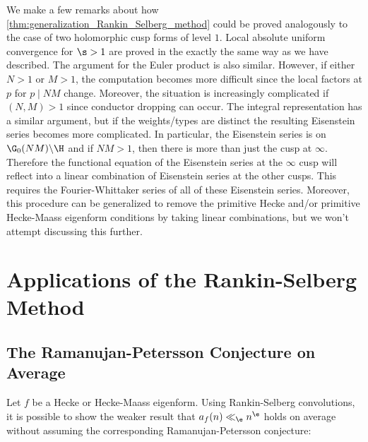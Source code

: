       We make a few remarks about how \cref{thm:generalization_Rankin_Selberg_method} could be proved analogously to the case of two holomorphic cusp forms of level $1$. Local absolute uniform convergence for $\s > 1$ are proved in the exactly the same way as we have described. The argument for the Euler product is also similar. However, if either $N > 1$ or $M > 1$, the computation becomes more difficult since the local factors at $p$ for $p \mid NM$ change. Moreover, the situation is increasingly complicated if $(N,M) > 1$ since conductor dropping can occur. The integral representation has a similar argument, but if the weights/types are distinct the resulting Eisenstein series becomes more complicated. In particular, the Eisenstein series is on $\G_{0}(NM)\backslash\H$ and if $NM > 1$, then there is more than just the cusp at $\infty$. Therefore the functional equation of the Eisenstein series at the $\infty$ cusp will reflect into a linear combination of Eisenstein series at the other cusps. This requires the Fourier-Whittaker series of all of these Eisenstein series. Moreover, this procedure can be generalized to remove the primitive Hecke and/or primitive Hecke-Maass eigenform conditions by taking linear combinations, but we won't attempt discussing this further. 
  \section{Applications of the Rankin-Selberg Method}
    \subsection*{The Ramanujan-Petersson Conjecture on Average}
      Let $f$ be a Hecke or Hecke-Maass eigenform. Using Rankin-Selberg convolutions, it is possible to show the weaker result that $a_{f}(n) \ll_{\e} n^{\e}$ holds on average without assuming the corresponding Ramanujan-Petersson conjecture:
      
